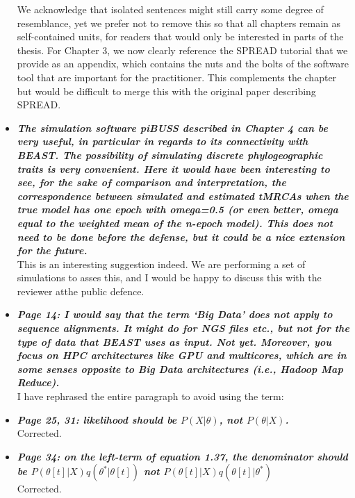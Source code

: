 \documentclass[english]{article}
\begin{document}
\begin{itemize}
We acknowledge that isolated sentences might still carry some degree of resemblance, yet we prefer not to remove this so that all chapters remain as self-contained units, for readers that would only be interested in parts of the thesis.
For Chapter 3, we now clearly reference the SPREAD tutorial that we provide as an appendix, which contains the nuts and the bolts of the software tool that are important for the practitioner.
This complements the chapter but would be difficult to merge this with the original paper describing SPREAD.



\item {
{\it
\textbf{
The simulation software piBUSS described in Chapter 4 can be very useful, in particular in regards to its connectivity with BEAST. 
The possibility of simulating discrete phylogeographic traits is very convenient. 
Here it would have been interesting to see, for the sake of comparison and interpretation, the correspondence between simulated and estimated tMRCAs when the true model has one epoch with omega=0.5 (or even better, omega equal to the weighted mean of the n-epoch model). 
This does not need to be done before the defense, but it could be a nice extension for the future.
}%
}%
}%
\\
This is an interesting suggestion indeed. We are performing a set of simulations to asses this, and I would be happy to discuss this with the reviewer atthe public defence.


\item {
{\it
\textbf{
Page 14: I would say that the term `Big Data' does not apply to sequence alignments. 
It might do for NGS files etc., but not for the type of data that BEAST uses as input. 
Not yet. 
Moreover, you focus on HPC architectures like GPU and multicores, which are in some senses opposite to Big Data architectures (i.e., Hadoop Map Reduce).
}%
}%
}%
\\
I have rephrased the entire paragraph to avoid using the term:

\begin{quote}
\myeditDPfive
\end{quote}


\item {
{\it
\textbf{
Page 25, 31: likelihood should be $P(X| \theta)$, not $P(\theta | X)$.
}%
}%
}%
\\
Corrected.


\item {
{\it
\textbf{
Page 34: on the left-term of equation 1.37, the denominator should be
$P(\theta[t]|X) q(\theta^{*} | \theta[t])$
not 
$P(\theta[t]|X) q(\theta[t] | \theta^{*})$
}%
}%
}%
\\
Corrected.



\end{itemize}
\end{document}
